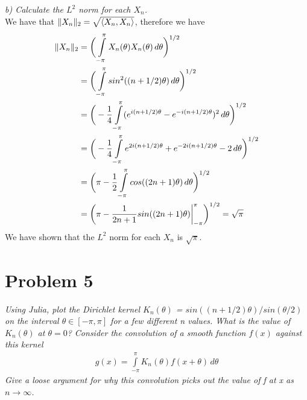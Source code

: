 \documentclass[12pt]{article}
\DeclarePairedDelimiter \norm{\lVert}{\rVert}%
\theoremstyle{remark}
\begin{document}
\newpage

\textit{b) Calculate the $L^2$ norm for each $X_n$.} \\

We have that $\norm{X_n}_2 = \sqrt{\braket{X_n, X_n}}$, therefore we have
\begin{align*}
	\norm{X_n}_2 & = \bigg( \int\limits_{-\pi}^\pi X_n(\theta)X_n(\theta) \, d\theta \bigg) ^{1/2 }\\ 
	& = \bigg( \int\limits_{-\pi}^{\pi} sin^2((n+1/2)\theta) \, d\theta \bigg)^{1/2} \\
	& = \bigg( -\frac{1}{4}\int\limits_{-\pi}^{\pi} ( e^{i(n+1/2)\theta} - e^{-i(n+1/2)\theta} )^2 \, d\theta \bigg)^{1/2} \\ 
	& = \bigg( -\frac{1}{4}\int\limits_{-\pi}^{\pi} e^{2i(n+1/2)\theta} + e^{-2i(n+1/2)\theta} - 2 \,	 d\theta \bigg)^{1/2} \\ 
	& = \bigg( \pi - \frac{1}{2}\int\limits_{-\pi}^{\pi} cos((2n+1)\theta) \, d\theta \bigg)^{1/2} \\ 
	& = \bigg( \pi - \frac{1}{2n+1}sin((2n+1)\theta)\bigg\vert_{-\pi}^{\pi} \bigg)^{1/2} = \sqrt{\pi}
\end{align*}
We have shown that the $L^2$ norm for each $X_n$ is $\sqrt{\pi}$.
\newpage

\section*{Problem 5}

\textit{Using Julia, plot the Dirichlet kernel $K_n(\theta)$ = $sin((n+1/2)\theta)/sin(\theta/2)$ on the interval $\theta \in [-\pi, \pi]$ for a few different n values. What is the value of $K_n(\theta)$ at $\theta = 0$? Consider the convolution of a smooth function $f(x)$ against this kernel}
\begin{align}
	g(x) = \int\limits_{-\pi}^\pi K_n(\theta) f(x + \theta) \, d\theta
\end{align}
\textit{Give a loose argument for why this convolution picks out the value of f at x as $n \rightarrow \infty$.}
\end{document}

